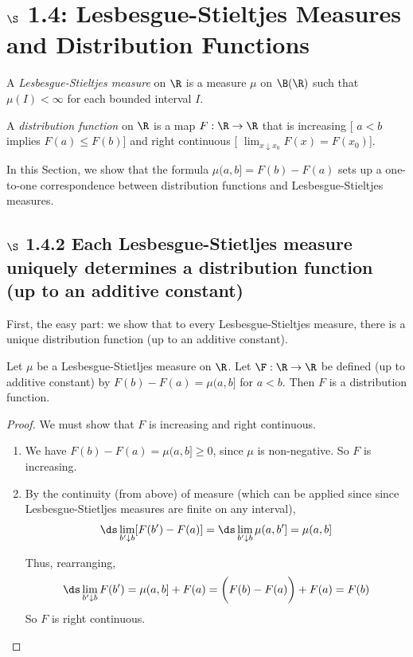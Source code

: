 \documentclass{article} %
\begin{document}
 \section{$\S$ 1.4: Lesbesgue-Stieltjes Measures and Distribution Functions} \label{sec:ls_measures_and_distribution_functions}
 
 \begin{definition}
 A \textit{Lesbesgue-Stieltjes measure} on $\R$ is a measure $\mu$ on $\B(\R)$ such that $\mu(I) < \infty$ for each bounded interval $I$.	
 \end{definition}

\begin{definition}
 A \textit{distribution function} on $\R$ is a map $F : \R \to \R$ that is increasing [ $a<b$ implies $F(a) \leq F(b)$] and right continuous [ $\lim_{x \downarrow x_0} F(x) = F(x_0)$]. 
 \end{definition}
 
In this Section, we show that the formula $\mu(a,b] = F(b) - F(a)$ sets up a one-to-one correspondence between distribution functions and Lesbesgue-Stieltjes measures.    

 
 \subsection{$\S$ 1.4.2 Each Lesbesgue-Stietljes measure uniquely determines a distribution function (up to an additive constant)}
 First, the easy part: we show that to every Lesbesgue-Stieltjes  measure, there is a unique distribution function (up to an additive constant). 
 
 \begin{theorem}
 Let $\mu$ be a Lesbesgue-Stietljes measure on $\R$.  Let $\F : \R \to \R$ be defined (up to additive constant) by $F(b)-F(a) = \mu(a,b]$ for $a<b$. Then $F$ is a distribution function.
 \end{theorem}

\begin{proof}
We must show that $F$ is increasing and right continuous.

\begin{enumerate}
\item We have $F(b) - F(a) = \mu(a,b] \geq 0$, since $\mu$ is non-negative. So $F$ is increasing.  
\item By the continuity (from above) of measure (which can be applied since since Lesbesgue-Stietljes measures are finite on any interval), 
\[ \ds\lim_{b' \downarrow b}[F(b') - F(a)] = \ds\lim_{b' \downarrow b} \mu(a,b'] = \mu(a,b]\]

Thus, rearranging,
\[ \ds\lim_{b' \downarrow b} F(b') = \mu(a,b] + F(a) = \bigg(F(b)-F(a)\bigg) + F(a) = F(b)\]
So $F$ is right continuous.  
\end{enumerate}
\end{proof}
\end{document}
